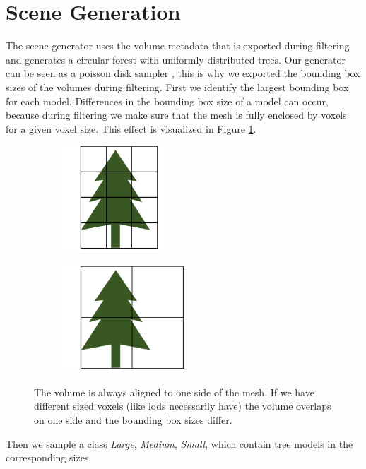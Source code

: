 \section{Scene Generation}
\label{sec:scene_generation}
The scene generator uses the volume metadata that is exported during filtering and generates a circular forest with uniformly distributed trees.
Our generator can be seen as a poisson disk sampler \cite{poisson_sampling}, this is why we exported the bounding box sizes of the volumes during filtering.
First we identify the largest bounding box for each model.
Differences in the bounding box size of a model can occur, because during filtering we make sure that the mesh is fully enclosed by voxels for a given voxel size.
This effect is visualized in Figure \ref{fig:bounding_sizes}.
\begin{figure}[ht]
    \centering
    \begin{subfigure}[b]{0.45\linewidth}
        \centering
        \includegraphics[height=4cm]{img/bounding_size_1.png}
    \end{subfigure}
    \begin{subfigure}[b]{0.45\linewidth}
        \centering
        \includegraphics[height=4cm]{img/bounding_size_2.png}
    \end{subfigure}
	\caption{The volume is always aligned to one side of the mesh. If we have different sized voxels (like \acsp{lod} necessarily have) the volume overlaps on one side and the bounding box sizes differ.}
	\label{fig:bounding_sizes}
\end{figure}
Then we sample a class \textit{Large}, \textit{Medium}, \textit{Small}, which contain tree models in the corresponding sizes.
